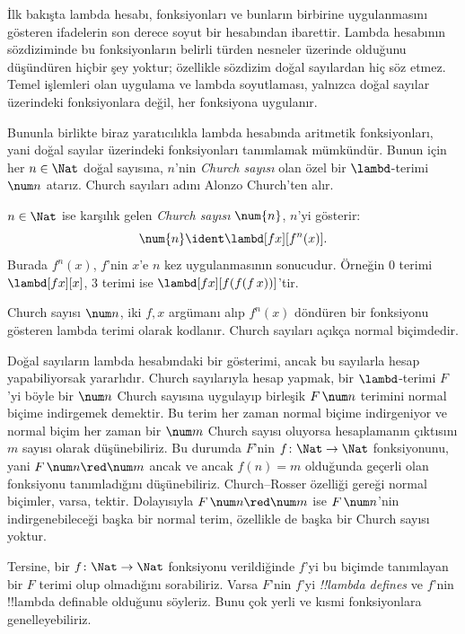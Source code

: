 \documentclass[../../../include/open-logic-section]{subfiles}
\begin{document}

İlk bakışta lambda hesabı, fonksiyonları ve bunların birbirine uygulanmasını
gösteren ifadelerin son derece soyut bir hesabından ibarettir. Lambda
hesabının sözdiziminde bu fonksiyonların belirli türden nesneler üzerinde
olduğunu düşündüren hiçbir şey yoktur; özellikle sözdizim doğal sayılardan
hiç söz etmez. Temel işlemleri olan uygulama ve lambda soyutlaması, yalnızca
doğal sayılar üzerindeki fonksiyonlara değil, her fonksiyona uygulanır.

Bununla birlikte biraz yaratıcılıkla lambda hesabında aritmetik fonksiyonları,
yani doğal sayılar üzerindeki fonksiyonları tanımlamak mümkündür. Bunun için
her $n\in\Nat$ doğal sayısına, $n$'nin \emph{Church sayısı} olan özel bir
$\lambd$-terimi $\num n$ atarız. Church sayıları adını Alonzo Church'ten alır.

\begin{defn}
  $n\in\Nat$ ise karşılık gelen \emph{Church sayısı} $\num{n}$, $n$'yi
  gösterir:
  \[
    \num{n} \ident \lambd[fx][f^n(x)].
  \]
  Burada $f^n(x)$, $f$'nin $x$'e $n$ kez uygulanmasının sonucudur. Örneğin
  $\num{0}$ terimi $\lambd[fx][x]$, $\num{3}$ terimi ise
  $\lambd[fx][f(f(f\,x))]$'tir.
\end{defn}

Church sayısı $\num n$, iki $f,x$ argümanı alıp $f^n(x)$ döndüren bir
fonksiyonu gösteren lambda terimi olarak kodlanır. Church sayıları açıkça
normal biçimdedir.

Doğal sayıların lambda hesabındaki bir gösterimi, ancak bu sayılarla hesap
yapabiliyorsak yararlıdır. Church sayılarıyla hesap yapmak, bir
$\lambd$-terimi $F$'yi böyle bir $\num n$ Church sayısına uygulayıp birleşik
$F\,\num n$ terimini normal biçime indirgemek demektir. Bu terim her zaman
normal biçime indirgeniyor ve normal biçim her zaman bir $\num m$ Church
sayısı oluyorsa hesaplamanın çıktısını $m$ sayısı olarak düşünebiliriz. Bu
durumda $F$'nin $f\colon\Nat\to\Nat$ fonksiyonunu, yani
$F\,\num n\red\num m$ ancak ve ancak $f(n)=m$ olduğunda geçerli olan
fonksiyonu tanımladığını düşünebiliriz. Church--Rosser özelliği gereği normal
biçimler, varsa, tektir. Dolayısıyla $F\,\num n\red\num m$ ise
$F\,\num n$'nin indirgenebileceği başka bir normal terim, özellikle de başka
bir Church sayısı yoktur.

Tersine, bir $f\colon\Nat\to\Nat$ fonksiyonu verildiğinde $f$'yi bu biçimde
tanımlayan bir $F$ terimi olup olmadığını sorabiliriz. Varsa $F$'nin $f$'yi
\emph{!!{lambda define}s} ve $f$'nin !!{lambda definable} olduğunu söyleriz.
Bunu çok yerli ve kısmi fonksiyonlara genelleyebiliriz.
\end{document}
